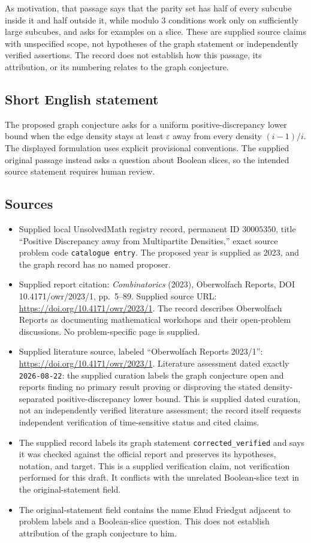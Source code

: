 \documentclass[11pt]{article}
\begin{document}
As motivation, that passage says that the parity set has half of every subcube inside it and half outside it, while modulo \(3\) conditions work only on sufficiently large subcubes, and asks for examples on a slice. These are supplied source claims with unspecified scope, not hypotheses of the graph statement or independently verified assertions. The record does not establish how this passage, its attribution, or its numbering relates to the graph conjecture.
\subsection{Short English statement}
The proposed graph conjecture asks for a uniform positive-discrepancy lower bound when the edge density stays at least \(\varepsilon\) away from every density \((i-1)/i\). The displayed formulation uses explicit provisional conventions. The supplied original passage instead asks a question about Boolean slices, so the intended source statement requires human review.
\subsection{Sources}
\begin{itemize}
\item Supplied local UnsolvedMath registry record, permanent ID \(30005350\), title ``Positive Discrepancy away from Multipartite Densities,'' exact source problem code \texttt{catalogue entry}. The proposed year is supplied as 2023, and the graph record has no named proposer.
\item Supplied report citation: \emph{Combinatorics} (2023), Oberwolfach Reports, DOI 10.4171/owr/2023/1, pp.\ 5--89. Supplied source URL: \url{https://doi.org/10.4171/owr/2023/1}. The record describes Oberwolfach Reports as documenting mathematical workshops and their open-problem discussions. No problem-specific page is supplied.
\item Supplied literature source, labeled ``Oberwolfach Reports 2023/1'': \url{https://doi.org/10.4171/owr/2023/1}. Literature assessment dated exactly \texttt{2026-08-22}: the supplied curation labels the graph conjecture open and reports finding no primary result proving or disproving the stated density-separated positive-discrepancy lower bound. This is supplied dated curation, not an independently verified literature assessment; the record itself requests independent verification of time-sensitive status and cited claims.
\item The supplied record labels its graph statement \texttt{corrected\_verified} and says it was checked against the official report and preserves its hypotheses, notation, and target. This is a supplied verification claim, not verification performed for this draft. It conflicts with the unrelated Boolean-slice text in the original-statement field.
\item The original-statement field contains the name Ehud Friedgut adjacent to problem labels and a Boolean-slice question. This does not establish attribution of the graph conjecture to him.
\end{itemize}
\end{document}
